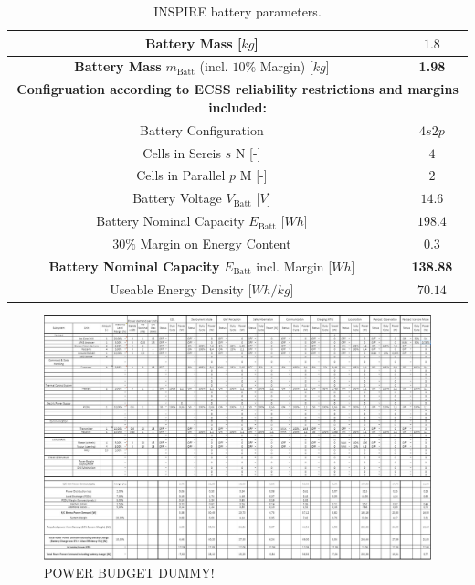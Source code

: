 \begin{table}[htb]
\begin{tabular}{|c|c|}
Battery Mass  [$kg$]                                                               & $1.8$                         \\ \hline
\textbf{Battery Mass} $m_\text{Batt}$ (incl. $10\%$ Margin) [$kg$]                                         & \textbf{1.98}                        \\ \hline
\multicolumn{2}{|c|}{\textbf{Configruation according to ECSS reliability restrictions and margins included:}} \\ \hline
Battery Configuration                                                           & $4s2p$                        \\ \hline
Cells in Sereis $s$ N [-]                                                       & $4$                           \\ \hline
Cells in Parallel $p$ M [-]                                                     & $2$                           \\ \hline
Battery Voltage $V_\text{Batt}$ [$V$]                                             & $14.6 $                       \\ \hline
Battery Nominal Capacity $E_\text{Batt}$ [$Wh$]                                   & $198.4$                       \\ \hline
$30\%$ Margin on Energy Content                                                 & $0.3$                         \\ \hline
\textbf{Battery Nominal Capacity} $E_\text{Batt}$ incl. Margin [$Wh$]                      & \textbf{138.88}                      \\ \hline
Useable Energy Density [$Wh/kg$]                                              & $70.14$                       \\ \hline
\end{tabular}
\caption{INSPIRE battery parameters.}
\label{tab:battery}
\end{table}

\begin{figure}[htb]
{\centering
\includegraphics[width=1.0\textwidth]{Media/powerbudgetdummy}
\caption{POWER BUDGET DUMMY!}
\label{tab:powerbudgetcomplete}
}
\end{figure}

